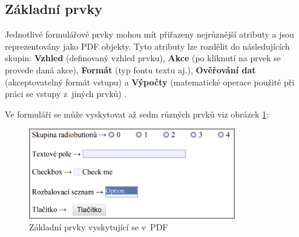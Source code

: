 \subsection{Základní prvky} \label{subsec:zakladni_prvky}
Jednotlivé formulářové prvky mohou mít přiřazeny nejrůznější atributy a jsou reprezentovány jako PDF objekty. Tyto atributy lze rozdělit do následujících skupin: \textbf{Vzhled} (definovaný vzhled prvku), \textbf{Akce} (po kliknutí na prvek se provede daná akce), \textbf{Formát} (typ fontu textu aj.), \textbf{Ověřování dat} (akceptovatelný formát vstupu) a \textbf{Výpočty} (matematické operace použité při práci se vstupy z~jiných prvků) \cite{PDFFormElements}. 
\par
Ve formuláři se může vyskytovat až sedm různých prvků viz obrázek \ref{fig:form_elements}:
	\begin{figure}[h!]
	\centering
	\includegraphics[width=9cm]{img/pdf_form_elements}
	\caption{Základní prvky vyskytující se v~PDF}
	\label{fig:form_elements}
	\end{figure}
